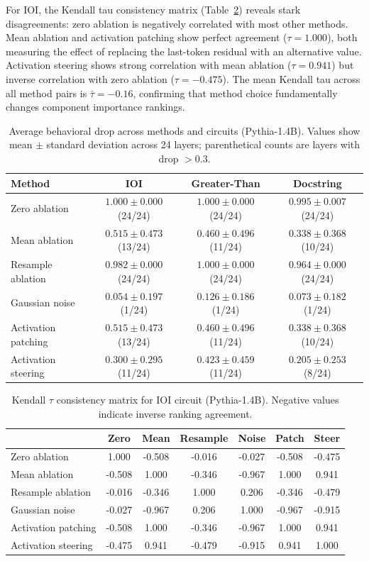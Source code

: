 \documentclass[pdflatex,sn-mathphys-num]{sn-jnl}
\begin{document}
For IOI, the Kendall tau consistency matrix (Table~\ref{tab:consistency}) reveals stark disagreements: zero ablation is negatively correlated with most other methods. Mean ablation and activation patching show perfect agreement ($\tau = 1.000$), both measuring the effect of replacing the last-token residual with an alternative value. Activation steering shows strong correlation with mean ablation ($\tau = 0.941$) but inverse correlation with zero ablation ($\tau = -0.475$). The mean Kendall tau across all method pairs is $\bar\tau = -0.16$, confirming that method choice fundamentally changes component importance rankings.

\begin{table}
\centering
\caption{Average behavioral drop across methods and circuits (Pythia-1.4B). Values show mean $\pm$ standard deviation across 24 layers; parenthetical counts are layers with drop $>0.3$.}
\label{tab:summary}
\begin{tabular}{lccc}
\toprule
Method & IOI & Greater-Than & Docstring \\
\midrule

Zero ablation & $1.000 \pm 0.000$ (24/24) & $1.000 \pm 0.000$ (24/24) & $0.995 \pm 0.007$ (24/24) \\
Mean ablation & $0.515 \pm 0.473$ (13/24) & $0.460 \pm 0.496$ (11/24) & $0.338 \pm 0.368$ (10/24) \\
Resample ablation & $0.982 \pm 0.000$ (24/24) & $1.000 \pm 0.000$ (24/24) & $0.964 \pm 0.000$ (24/24) \\
Gaussian noise & $0.054 \pm 0.197$ (1/24) & $0.126 \pm 0.186$ (1/24) & $0.073 \pm 0.182$ (1/24) \\
Activation patching & $0.515 \pm 0.473$ (13/24) & $0.460 \pm 0.496$ (11/24) & $0.338 \pm 0.368$ (10/24) \\
Activation steering & $0.300 \pm 0.295$ (11/24) & $0.423 \pm 0.459$ (11/24) & $0.205 \pm 0.253$ (8/24) \\
\bottomrule
\end{tabular}
\end{table}

\begin{table}
\centering
\caption{Kendall $\tau$ consistency matrix for IOI circuit (Pythia-1.4B). Negative values indicate inverse ranking agreement.}
\label{tab:consistency}
\begin{tabular}{lcccccc}
\toprule
 & Zero & Mean & Resample & Noise & Patch & Steer \\
\midrule
Zero ablation & 1.000 & -0.508 & -0.016 & -0.027 & -0.508 & -0.475 \\
Mean ablation & -0.508 & 1.000 & -0.346 & -0.967 & 1.000 & 0.941 \\
Resample ablation & -0.016 & -0.346 & 1.000 & 0.206 & -0.346 & -0.479 \\
Gaussian noise & -0.027 & -0.967 & 0.206 & 1.000 & -0.967 & -0.915 \\
Activation patching & -0.508 & 1.000 & -0.346 & -0.967 & 1.000 & 0.941 \\
Activation steering & -0.475 & 0.941 & -0.479 & -0.915 & 0.941 & 1.000 \\
\bottomrule
\end{tabular}
\end{table}
\end{document}
